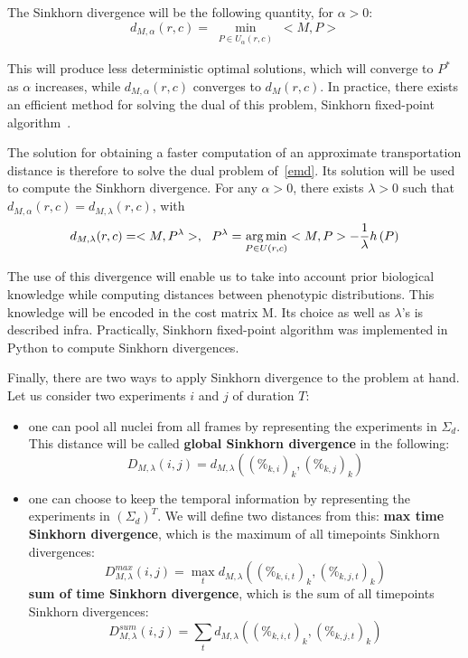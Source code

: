 The Sinkhorn divergence will be the following quantity, for $\alpha >0$:
\begin{equation}
d_{M, \alpha}(r,c) = \min_{\substack{P\in U_\alpha (r,c)}} <M,P>
\label{emd}
\end{equation}

This will produce less deterministic optimal solutions, which will converge to $P^*$ as $\alpha$ increases, while $d_{M, \alpha}(r,c)$ converges to $d_{M}(r,c)$. In practice, there exists an efficient method for solving the dual of this problem, Sinkhorn fixed-point algorithm~\cite{sinkhorn_original}. 

The solution for obtaining a faster computation of an approximate transportation distance is therefore to solve the dual problem of~\ref{emd}. Its solution will be used to compute the Sinkhorn divergence. For any $\alpha >0$, there exists $\lambda >0$ such that $d_{M, \alpha}(r,c) = d_{M, \lambda}(r,c)$, with
\[
d_{M, \lambda}(r,c) = <M,P^\lambda>,~~ P^\lambda = \operatorname*{arg\,min}_{\substack{P\in U (r,c)}} <M,P> - \dfrac{1}{\lambda} h\left( P\right)
\]

The use of this divergence will enable us to take into account prior biological knowledge while computing distances between phenotypic distributions. This knowledge will be encoded in the cost matrix M. Its choice as well as $\lambda$'s is described infra. Practically, Sinkhorn fixed-point algorithm was implemented in Python to compute Sinkhorn divergences.

Finally, there are two ways to apply Sinkhorn divergence to the problem at hand. Let us consider two experiments $i$ and $j$ of duration $T$: 

\begin{itemize}
\item one can pool all nuclei from all frames by representing the experiments in $\Sigma_d$. This distance will be called \textbf{global Sinkhorn divergence} in the following:
\begin{equation}
D_{M,\lambda}(i,j)= d_{M,\lambda}((\%_{k,i})_{k},(\%_{k,j})_{k})
\label{global}
\end{equation}
\item one can choose to keep the temporal information by representing the experiments in $\left(\Sigma_d\right) ^T$. We will define two distances from this:
\subitem \textbf{max time Sinkhorn divergence}, which is the maximum of all timepoints Sinkhorn divergences:
\begin{equation}
D_{M,\lambda}^{max}(i,j)= \max_t d_{M,\lambda}((\%_{k,i,t})_{k},(\%_{k,j,t})_{k})
\label{max}
\end{equation}
\subitem \textbf{sum of time Sinkhorn divergence}, which is the sum of all timepoints Sinkhorn divergences: 
\begin{equation}
D_{M,\lambda}^{sum}(i,j)= \sum_t d_{M,\lambda}((\%_{k,i,t})_{k},(\%_{k,j,t})_{k})
\label{int}
\end{equation}
\end{itemize}

